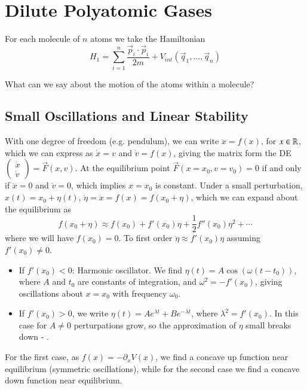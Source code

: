 \documentclass[12pt, a4paper, oneside, openright, titlepage]{book}
\begin{document}
\section{Dilute Polyatomic Gases}

For each molecule of $n$ atoms we take the Hamiltonian \begin{equation*}
    H_1 = \sum_{i=1}^n\frac{\vec{p}_i\cdot\vec{p}_i}{2m} + V_{int}(\vec{q}_1,...,\vec{q}_n)
\end{equation*}

\begin{qst}
    What can we say about the motion of the atoms within a molecule?
\end{qst}

\subsection{Small Oscillations and Linear Stability}

With one degree of freedom (e.g. pendulum), we can write $\ddot{x} = f(x)$, for $x \in \mathbb R$, which we can express as $\dot{x} = v$ and $\dot{v} = f(x)$, giving the matrix form the DE $\begin{pmatrix} \dot{x} \\ \dot{v} \end{pmatrix} = \vec{F}(x,v)$. At the equilibrium point $\vec{F}(x=x_0,v=v_0) = 0$ if and only if $\dot{x} = 0$ and $\dot{v} = 0$, which implies $x = x_0$ is constant. Under a small perturbation, $x(t) = x_0+\eta(t)$, $\ddot{\eta} = \ddot{x} = f(x) = f(x_0+\eta)$, which we can expand about the equilibrium as $$f(x_0+\eta) \approx f(x_0) + f'(x_0)\eta + \frac{1}{2}f''(x_0)\eta^2+\cdots$$
where we will have $f(x_0) = 0$. To first order $\ddot{\eta} \approx f'(x_0)\eta$ assuming $f'(x_0) \neq 0$.
\begin{itemize}
    \item If $f'(x_0) < 0$: Harmonic oscillator. We find $\eta(t) = A\cos(\omega(t-t_0))$, where $A$ and $t_0$ are constants of integration, and $\omega^2 = -f'(x_0)$, giving  oscillations about $x = x_0$ with frequency $\omega_0$.
    \item If $f'(x_0) > 0$, we write $\eta(t) = Ae^{\lambda t} + Be^{-\lambda t}$, where $\lambda^2 = f'(x_0)$. In this case for $A \neq 0$ perturpations grow, so the approximation of $\eta$ small breaks down - .
\end{itemize}

For the first case, as $f(x) = -\partial_xV(x)$, we find a concave up function near equilibrium (symmetric oscillations), while for the second case we find a concave down function near equilibrium. 
\end{document}
